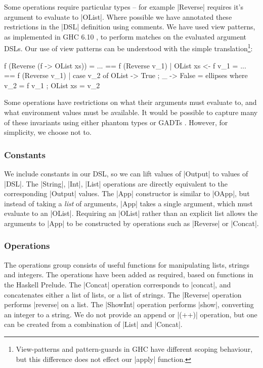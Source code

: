 \documentclass{llncs}
\begin{document}
Some operations require particular types -- for example |Reverse| requires it's argument to evaluate to |OList|. Where possible we have annotated these restrictions in the |DSL| definition using comments. We have used view patterns, as implemented in GHC 6.10 \cite{ghc6_10}, to perform matches on the evaluated argument DSLs. Our use of view patterns can be understood with the simple translation\footnote{View-patterns and pattern-guards in GHC have different scoping behaviour, but this difference does not effect our |apply| function.}:

\ignore\begin{code}
f (Reverse (f -> OList xs)) = ...
    ==
f (Reverse v_1) | OList xs <- f v_1 = ...
    ==
f (Reverse v_1) | case v_2 of OList{} -> True ; _ -> False = ellipses
    where  v_2 = f v_1 ; OList xs = v_2
\end{code}

Some operations have restrictions on what their arguments must evaluate to, and what environment values must be available. It would be possible to capture many of these invariants using either phantom types \cite{fluet:phantom} or GADTs \cite{spj:gadt}. However, for simplicity, we choose not to.

\subsubsection{Constants}

We include constants in our DSL, so we can lift values of |Output| to values of |DSL|. The |String|, |Int|, |List| operations are directly equivalent to the corresponding |Output| values. The |App| constructor is similar to |OApp|, but instead of taking a \textit{list} of arguments, |App| takes a single argument, which must evaluate to an |OList|. Requiring an |OList| rather than an explicit list allows the arguments to |App| to be constructed by operations such as |Reverse| or |Concat|.

\subsubsection{Operations}

The operations group consists of useful functions for manipulating lists, strings and integers. The operations have been added as required, based on functions in the Haskell Prelude. The |Concat| operation corresponds to |concat|, and concatenates either a list of lists, or a list of strings. The |Reverse| operation performs |reverse| on a list. The |ShowInt| operation performs |show|, converting an integer to a string. We do not provide an append or |(++)| operation, but one can be created from a combination of |List| and |Concat|.
\end{document}
